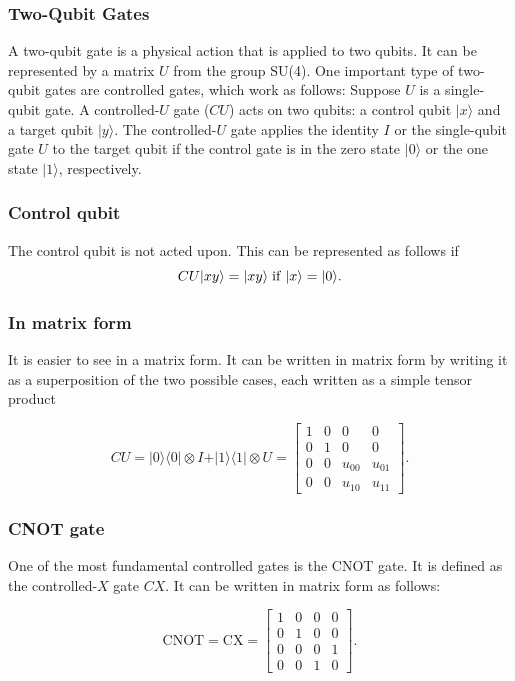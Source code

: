 \documentclass{beamer}
\begin{document}
\begin{frame}
\frametitle{Two-Qubit Gates}

A two-qubit gate is a physical action that is applied to two
qubits. It can be represented by a matrix $U$ from the group
SU(4). One important type of two-qubit gates are controlled gates,
which work as follows: Suppose $U$ is a single-qubit gate. A
controlled-$U$ gate ($CU$) acts on two qubits: a control qubit
$\vert x \rangle $ and a target qubit $\vert y \rangle $. The controlled-$U$ gate
applies the identity $I$ or the single-qubit gate $U$ to the target
qubit if the control gate is in the zero state $\vert 0\rangle$ or the one
state $\vert 1\rangle$, respectively.
\end{frame}

\begin{frame}
\frametitle{Control qubit}

The control qubit is not acted
upon. This can be represented as follows if
\[CU\vert xy\rangle=
\vert xy\rangle \hspace{0.1cm} \mathrm{if} \hspace{0.1cm}  \vert x \rangle =\vert 0\rangle.
\]
\end{frame}

\begin{frame}
\frametitle{In matrix form}

It is easier to see in a matrix form.
It can be written in matrix form by writing it as a superposition of
the two possible cases, each written as a simple tensor product

\[
CU = \vert 0\rangle\langle 0\vert\otimes I + \vert 1\rangle\langle 1 \vert \otimes U=\begin{bmatrix}
1 & 0 & 0 & 0 \\
0 & 1 & 0 & 0 \\
0 & 0 & u_{00} & u_{01} \\
0 & 0 & u_{10} & u_{11}
\end{bmatrix}.
\]
\end{frame}

\begin{frame}
\frametitle{CNOT gate}

One of the most fundamental controlled gates is the CNOT gate. It is
defined as the controlled-$X$ gate $CX$. It can be written in matrix form as follows:

\[
\mathrm{CNOT}=\mathrm{CX}=\begin{bmatrix}
1 & 0 & 0 & 0 \\
0 & 1 & 0 & 0 \\
0 & 0 & 0 & 1 \\
0 & 0 & 1 & 0
\end{bmatrix}.
\]
\end{frame}
\end{document}
